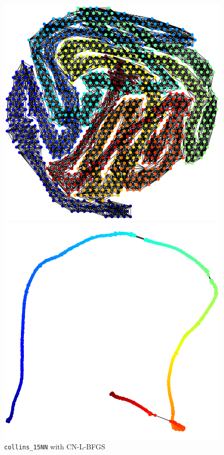 \documentclass[dvipdfmx,10pt,journal,compsoc]{IEEEtran}
\begin{document}
\begin{figure}[t]
  \centering
  \begin{minipage}{0.49\columnwidth}
    \centering
    \includegraphics[width=\columnwidth]{circle/vis/collins_15NN_CN-L-BFGS_50_first.png}
  \end{minipage}
  \begin{minipage}{0.49\columnwidth}
    \centering
    \includegraphics[width=\columnwidth]{circle/vis/collins_15NN_CN-L-BFGS_50_last.png}
  \end{minipage}
  \caption{\texttt{collins\_15NN} with \textsf{CN-L-BFGS}}
  \label{fig:collins_15NN_CN}
\end{figure}
\end{document}
